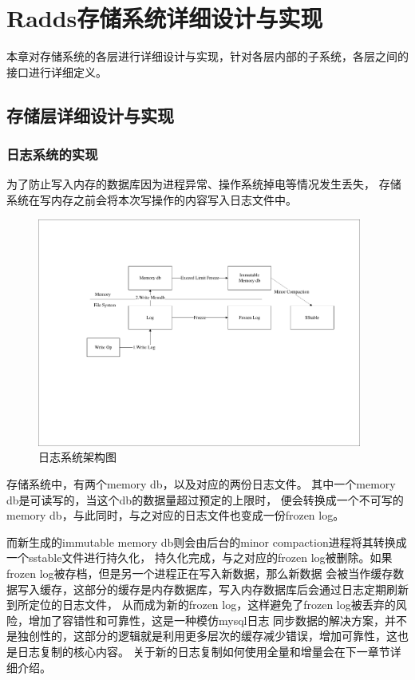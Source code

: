 \section{Radds存储系统详细设计与实现}

	本章对存储系统的各层进行详细设计与实现，针对各层内部的子系统，各层之间的接口进行详细定义。
	
  	\subsection{存储层详细设计与实现}

	  \subsubsection{日志系统的实现}
    
	  为了防止写入内存的数据库因为进程异常、操作系统掉电等情况发生丢失，
	  存储系统在写内存之前会将本次写操作的内容写入日志文件中。

   \begin{figure}[H]
	   \centering
	   \includegraphics[width=0.95\textwidth]{pdf/two_log.pdf}
	   \caption{日志系统架构图}
	   \label{two_log}
   \end{figure}
   存储系统中，有两个memory db，以及对应的两份日志文件。
   其中一个memory db是可读写的，当这个db的数据量超过预定的上限时，
   便会转换成一个不可写的memory db，与此同时，与之对应的日志文件也变成一份frozen log。

   而新生成的immutable memory db则会由后台的minor compaction进程将其转换成一个sstable文件进行持久化，
   持久化完成，与之对应的frozen log被删除。如果frozen log被存档，但是另一个进程正在写入新数据，那么新数据
   会被当作缓存数据写入缓存，这部分的缓存是内存数据库，写入内存数据库后会通过日志定期刷新到所定位的日志文件，
   从而成为新的frozen log，这样避免了frozen log被丢弃的风险，增加了容错性和可靠性，这是一种模仿mysql日志
   同步数据的解决方案，并不是独创性的，这部分的逻辑就是利用更多层次的缓存减少错误，增加可靠性，这也是日志复制的核心内容。
   关于新的日志复制如何使用全量和增量会在下一章节详细介绍。

